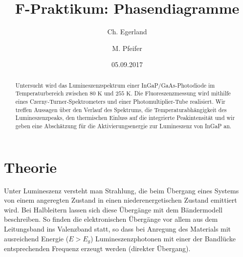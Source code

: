 \documentclass[aps,twocolumn,secnumarabic,nobalancelastpage,amsmath,amssymb,
nofootinbib,superscriptaddress]{revtex4-1}
\begin{document}
\title{F-Praktikum: Phasendiagramme}
\author         {Ch. Egerland}
\author         {M. Pfeifer}
\date[Versuchsdatum: ]{05.09.2017}

\begin{abstract}
Untersucht wird das Lumineszenzspektrum einer InGaP/GaAs-Photodiode im Temperaturbereich zwischen
$80\text{ K}$ und $255\text{ K}$. Die Fluoreszenzmessung wird mithilfe eines Czerny-Turner-Spektrometers
und einer Photomultiplier-Tube realisiert. Wir treffen Aussagen über den Verlauf des Spektrums, die
Temperaturabhängigkeit des Lumineszenzpeaks, den thermischen Einluss auf die integrierte Peakintensität und
wir geben eine Abschätzung für die Aktivierungsenergie zur Lumineszenz von InGaP an.
\end{abstract}


\maketitle



\section{Theorie}

\noindent Unter Lumineszenz versteht man Strahlung, die beim Übergang eines Systems von einem angeregten Zustand
in einen niederenergetischen Zustand emittiert wird. Bei Halbleitern lassen sich diese Übergänge mit dem Bändermodell
beschreiben. So finden die elektronischen Übergänge vor allem aus dem Leitungsband ins Valenzband statt, so dass bei
Anregung des Materials mit ausreichend Energie ($E>E_g$) Lumineszenzphotonen mit einer der Bandlücke entsprechenden
Frequenz erzeugt werden (direkter Übergang).\newline
\end{document}
